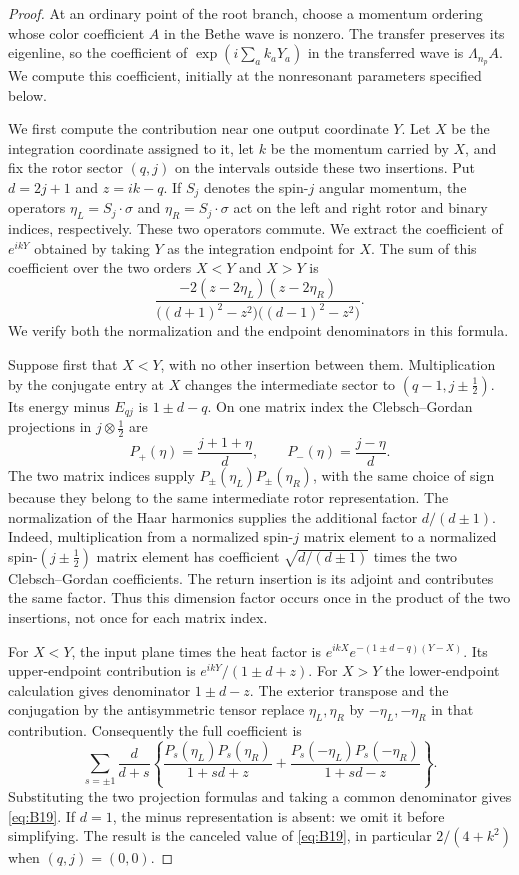 \begin{proof}
At an ordinary point of the root branch, choose a momentum ordering
whose color coefficient $A$ in the Bethe wave is nonzero.
The transfer preserves its eigenline, so the coefficient of
$\exp(i\sum_a k_aY_a)$ in the transferred wave is
$\Lambda_{n_p}A$.  We compute this coefficient, initially at the
nonresonant parameters specified below.

We first compute the contribution near one output coordinate $Y$.  Let
$X$ be the integration coordinate assigned to it, let $k$ be the momentum
carried by $X$, and fix the rotor sector $(q,j)$ on the intervals outside
these two insertions.  Put $d=2j+1$ and $z=ik-q$.  If $S_j$ denotes the
spin-$j$ angular momentum, the operators
$\eta_L=S_j\cdot\sigma$ and $\eta_R=S_j\cdot\sigma$ act on the left and
right rotor and binary indices, respectively.  These two operators
commute.  We extract the coefficient of $e^{ikY}$ obtained by taking
$Y$ as the integration endpoint for $X$.  The sum of this coefficient
over the two orders $X<Y$ and $X>Y$ is
\begin{equation}
 \frac{-2(z-2\eta_L)(z-2\eta_R)}
 {\bigl((d+1)^2-z^2\bigr)\bigl((d-1)^2-z^2\bigr)}.
 \label{eq:B19}
\end{equation}
We verify both the normalization and the endpoint denominators in this
formula.

Suppose first that $X<Y$, with no other insertion between them.
Multiplication by the conjugate entry at $X$ changes the intermediate
sector to $(q-1,j\pm\tfrac12)$.  Its energy minus $E_{qj}$ is
$1\pm d-q$.  On one matrix index the Clebsch--Gordan projections in
$j\otimes\tfrac12$ are
\[
 P_+(\eta)=\frac{j+1+\eta}{d},\qquad
 P_-(\eta)=\frac{j-\eta}{d}.
\]
The two matrix indices supply $P_\pm(\eta_L)P_\pm(\eta_R)$, with the same
choice of sign because they belong to the same intermediate rotor
representation.  The normalization of the Haar harmonics supplies the
additional factor $d/(d\pm1)$.  Indeed, multiplication from a normalized
spin-$j$ matrix element to a normalized spin-$(j\pm\tfrac12)$ matrix
element has coefficient $\sqrt{d/(d\pm1)}$ times the two
Clebsch--Gordan coefficients.  The return insertion is its adjoint and
contributes the same factor.  Thus this
dimension factor occurs once in the product of the two insertions, not
once for each matrix index.

For $X<Y$, the input plane times the heat factor is
$e^{ikX}e^{-(1\pm d-q)(Y-X)}$.
Its upper-endpoint contribution is $e^{ikY}/(1\pm d+z)$.
For $X>Y$ the lower-endpoint calculation gives denominator
$1\pm d-z$.  The exterior transpose and the conjugation by the
antisymmetric tensor replace $\eta_L,\eta_R$ by $-\eta_L,-\eta_R$ in
that contribution.  Consequently the full coefficient is
\[
 \sum_{s=\pm1}\frac{d}{d+s}
 \left\{
 \frac{P_s(\eta_L)P_s(\eta_R)}{1+sd+z}
 +\frac{P_s(-\eta_L)P_s(-\eta_R)}{1+sd-z}
 \right\}.
\]
Substituting the two projection formulas and taking a common denominator
gives \eqref{eq:B19}.  If $d=1$, the minus representation is absent:
we omit it before simplifying.  The result is the canceled value of
\eqref{eq:B19}, in particular $2/(4+k^2)$ when $(q,j)=(0,0)$.


\end{proof}
